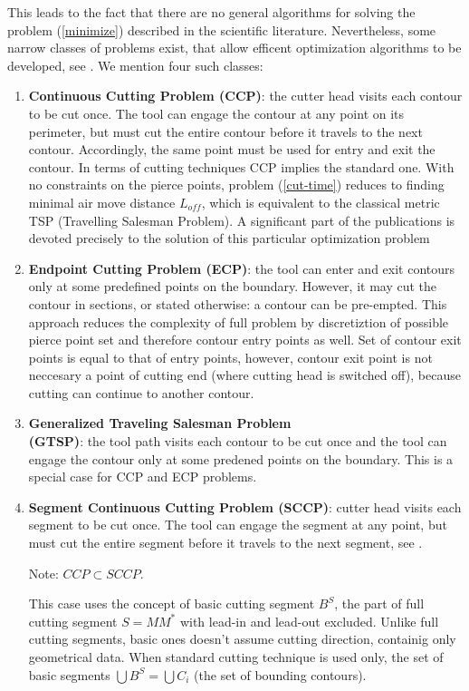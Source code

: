 \documentclass{ifacconf}
\begin{document}
This leads to the fact that
there are no general algorithms for solving the problem (\ref{minimize})
described in the scientific literature.
Nevertheless,
some narrow classes of problems
exist,
that allow efficent optimization algorithms to be developed,
see \cite{Dewil2016Nov}.
We mention four such classes:

\begin{enumerate}
    \item \textbf{Continuous Cutting Problem (CCP)}:
    the cutter head visits each contour to be cut once.
    The tool can engage the contour at any point on its perimeter,
    but must cut the entire
    contour before it travels to the next contour.
    Accordingly, the same point must be used for
    entry and exit the contour.
    In terms of cutting techniques CCP implies the standard one.
    With no constraints on the pierce points,
    problem (\ref{cut-time}) reduces to finding minimal
    air move distance $L_{off}$,
    which is equivalent to the classical metric TSP
    (Travelling Salesman Problem).
    A significant part of the publications is devoted precisely
    to the solution of this particular optimization problem

    \item \textbf{Endpoint Cutting Problem (ECP)}:
    the tool can enter and exit contours only at some
    predefined points on the boundary.
    However, it may cut the contour in sections,
    or stated otherwise: a contour can be pre-empted.
    This approach reduces the complexity of full problem
    by discretiztion of possible pierce point set and therefore
    contour entry points as well.
    Set of contour exit points is equal to that of
    entry points, however,
    contour exit point is not neccesary
    a point of cutting end
    (where cutting head is switched off),
    because cutting can continue to another contour.

    \item \textbf{Generalized Traveling Salesman Problem \\ (GTSP)}:
    the tool path visits each contour to be cut once
    and the tool can engage the contour only
    at some predened points on the boundary.
    This is a special case for CCP and ECP problems.

    \item \textbf{Segment Continuous Cutting Problem (SCCP)}:
    cutter head visits each segment to be cut once.
    The tool can engage the segment at any point,
    but must cut the entire segment before it travels to the next segment,
    see \cite{Petunin2015Nov}.

    Note: $CCP \subset SCCP$.

    This case uses the concept of basic cutting segment
    $B^S$, the part of full cutting segment
    $S = MM^*$ with lead-in and lead-out excluded.
    Unlike full cutting segments,
    basic ones doesn't assume cutting direction,
    containig only geometrical data.
    When standard cutting technique is used only,
    the set of basic segments $\bigcup B^S = \bigcup C_i$
    (the set of bounding contours).

\end{enumerate}
\end{document}
